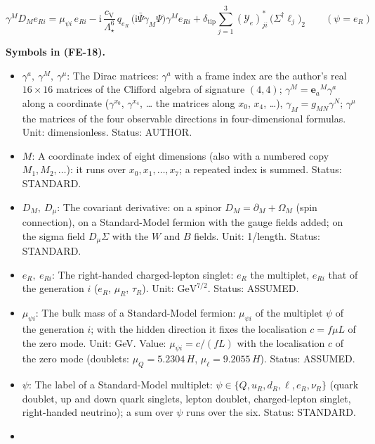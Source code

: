 \documentclass[
  10pt,
]{article}
\providecommand{\tightlist}{%
  \setlength{\itemsep}{0pt}\setlength{\parskip}{0pt}}
\begin{document}
\[
\gamma^MD_Me_{Ri} = \mu_{\psi i}\,e_{Ri} - \mathrm{i}\,\frac{c_{\mathrm{V}}}{\Lambda_\star^6}\,q_{e_R}\,
 \big(\mathrm{i}\bar\Psi\gamma_M\Psi\big)\gamma^Me_{Ri}
 + \delta_{\mathrm{tip}}\sum_{j=1}^{3}(\mathcal{Y}_e)^*_{ji}\,\big(\Sigma^\dagger\ell_j\big)_2\qquad
 (\psi = e_R) \tag{FE-18}
\]

\textbf{Symbols in (FE-18).}

\begin{itemize}
\tightlist
\item
  \(\gamma^a,\ \gamma^M,\ \gamma^\mu\): The Dirac matrices: \(\gamma^a\)
  with a frame index are the author's real \(16 \times 16\) matrices of
  the Clifford algebra of signature \((4, 4)\);
  \(\gamma^M = \mathbf{e}_a{}^M\gamma^a\) along a coordinate
  (\(\gamma^{x_0}\), \(\gamma^{x_4}\), \ldots{} the matrices along
  \(x_0\), \(x_4\), \ldots), \(\gamma_M = g_{MN}\gamma^N\);
  \(\gamma^\mu\) the matrices of the four observable directions in
  four-dimensional formulas. Unit: dimensionless. Status: AUTHOR.
\item
  \(M\): A coordinate index of eight dimensions (also with a numbered
  copy \(M_1, M_2, \dots\)): it runs over \(x_0, x_1, \dots, x_7\); a
  repeated index is summed. Status: STANDARD.
\item
  \(D_M,\ D_\mu\): The covariant derivative: on a spinor
  \(D_M = \partial_M + \Omega_M\) (spin connection), on a Standard-Model
  fermion with the gauge fields added; on the sigma field
  \(D_\mu\Sigma\) with the \(W\) and \(B\) fields. Unit: 1/length.
  Status: STANDARD.
\item
  \(e_R,\ e_{Ri}\): The right-handed charged-lepton singlet: \(e_R\) the
  multiplet, \(e_{Ri}\) that of the generation \(i\) (\(e_R\),
  \(\mu_R\), \(\tau_R\)). Unit: \(\mathrm{GeV}^{7/2}\). Status: ASSUMED.
\item
  \(\mu_{\psi i}\): The bulk mass of a Standard-Model fermion:
  \(\mu_{\psi i}\) of the multiplet \(\psi\) of the generation \(i\);
  with the hidden direction it fixes the localisation \(c = f\mu L\) of
  the zero mode. Unit: GeV. Value: \(\mu_{\psi i} = c/(fL)\) with the
  localisation \(c\) of the zero mode (doublets: \(\mu_Q = 5.2304\,H\),
  \(\mu_\ell = 9.2055\,H\)). Status: ASSUMED.
\item
  \(\psi\): The label of a Standard-Model multiplet:
  \(\psi \in \{Q, u_R, d_R, \ell, e_R, \nu_R\}\) (quark doublet, up and
  down quark singlets, lepton doublet, charged-lepton singlet,
  right-handed neutrino); a sum over \(\psi\) runs over the six. Status:
  STANDARD.
\item

\end{itemize}
\end{document}
